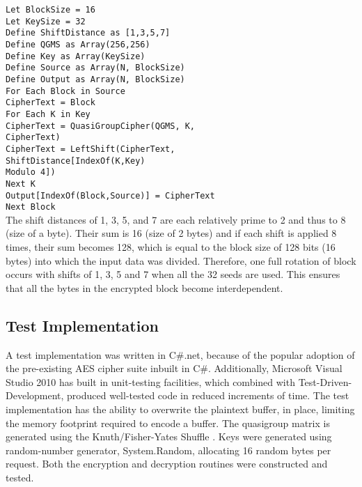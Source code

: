 \documentclass[conference]{IEEEtran}
\begin{document}
\noindent\verb"Let BlockSize = 16"\\
\verb"Let KeySize = 32"\\
\verb"Define ShiftDistance as [1,3,5,7]"\\
\verb"Define QGMS as Array(256,256)"\\
\verb"Define Key as Array(KeySize)"\\
\verb"Define Source as Array(N, BlockSize)"\\
\verb"Define Output as Array(N, BlockSize)"\\
\verb"For Each Block in Source"\\
\hspace*{1em}\verb"CipherText = Block"\\
\hspace*{1em}\verb"For Each K in Key"\\
    \hspace*{2em}\verb"CipherText = QuasiGroupCipher(QGMS, K,"\\
            \hspace*{4em}\verb"CipherText)"\\
	\hspace*{2em}\verb"CipherText = LeftShift(CipherText,"\\
            \hspace*{4em}\verb"ShiftDistance[IndexOf(K,Key)"\\
            \hspace*{5em}\verb"Modulo 4])"\\
\hspace*{1em}\verb"Next K"\\
\verb"Output[IndexOf(Block,Source)] = CipherText"\\
\verb"Next Block"\\

The shift distances of 1, 3, 5, and 7 are each relatively prime to 2 and thus to 8 (size of a byte). Their sum is 16 (size of 2 bytes) and if each shift is applied 8 times, their sum becomes 128, which is equal to the block size of 128 bits (16 bytes) into which the input data was divided. Therefore, one full rotation of block occurs with shifts of 1, 3, 5 and 7 when all the 32 seeds are used. This ensures that all the bytes in the encrypted block become interdependent.\\


\subsection{Test Implementation}
A test implementation was written in C\#.net, because of the popular adoption of the pre-existing AES cipher suite inbuilt in C\#. Additionally, Microsoft Visual Studio 2010 has built in unit-testing facilities, which combined with Test-Driven-Development, produced well-tested code in reduced increments of time. The test implementation has the ability to overwrite the plaintext buffer, in place, limiting the memory footprint required to encode a buffer. The quasigroup matrix is generated using the Knuth/Fisher-Yates Shuffle \cite{Fisher}. Keys were generated using random-number generator, System.Random, allocating 16 random bytes per request. Both the encryption and decryption routines were constructed and tested.
\end{document}
